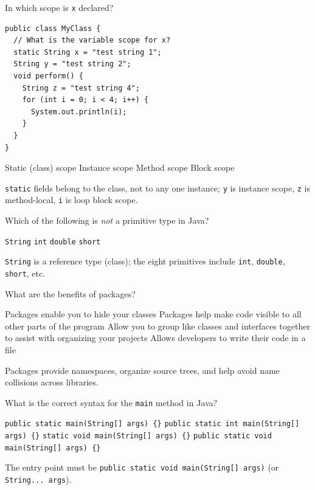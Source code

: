 \question[4]
In which scope is \texttt{x} declared?
\begin{lstlisting}[style=java]
public class MyClass {
  // What is the variable scope for x?
  static String x = "test string 1";
  String y = "test string 2";
  void perform() {
    String z = "test string 4";
    for (int i = 0; i < 4; i++) {
      System.out.println(i);
    }
  }
}
\end{lstlisting}
\begin{choices}
  \CorrectChoice Static (class) scope
  \choice Instance scope
  \choice Method scope
  \choice Block scope
\end{choices}
\begin{solution}
  \texttt{static} fields belong to the class, not to any one instance; \texttt{y} is instance scope, \texttt{z} is method-local, \texttt{i} is loop block scope.
\end{solution}

\question[4]
Which of the following is \emph{not} a primitive type in Java?
\begin{choices}
  \CorrectChoice \lstinline!String!
  \choice \lstinline!int!
  \choice \lstinline!double!
  \choice \lstinline!short!
\end{choices}
\begin{solution}
  \texttt{String} is a reference type (class); the eight primitives include \texttt{int}, \texttt{double}, \texttt{short}, etc.
\end{solution}

\newpage

\question[4]
What are the benefits of packages?
\begin{choices}
  \choice Packages enable you to hide your classes
  \choice Packages help make code visible to all other parts of the program
  \CorrectChoice Allow you to group like classes and interfaces together to assist with organizing your projects
  \choice Allows developers to write their code in a file
\end{choices}
\begin{solution}
  Packages provide namespaces, organize source trees, and help avoid name collisions across libraries.
\end{solution}

\question[4]
What is the correct syntax for the \texttt{main} method in Java?
\begin{choices}
  \choice \lstinline!public static main(String[] args) {}!
  \choice \lstinline!public static int main(String[] args) {}!
  \choice \lstinline!static void main(String[] args) {}!
  \CorrectChoice \lstinline!public static void main(String[] args) {}!
\end{choices}
\begin{solution}
  The entry point must be \texttt{public static void main(String[] args)} (or \texttt{String... args}).
\end{solution}

